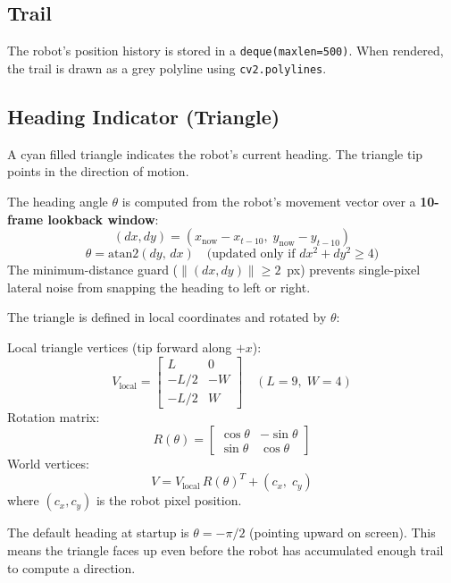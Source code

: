 \documentclass[12pt,a4paper]{article}
\begin{document}
\subsection{Trail}

The robot's position history is stored in a \texttt{deque(maxlen=500)}.
When rendered, the trail is drawn as a grey polyline using
\texttt{cv2.polylines}.

\subsection{Heading Indicator (Triangle)}

A cyan filled triangle indicates the robot's current heading.
The triangle tip points in the direction of motion.

\begin{tcolorbox}[formulabox, title={Heading Angle}]
The heading angle $\theta$ is computed from the robot's movement vector
over a \textbf{10-frame lookback window}:
\[
  (dx, dy) = (x_{\text{now}} - x_{t-10},\; y_{\text{now}} - y_{t-10})
\]
\[
  \theta = \mathrm{atan2}(dy,\, dx)
  \quad \text{(updated only if } dx^2 + dy^2 \geq 4\text{)}
\]
The minimum-distance guard ($\|{(dx,dy)}\| \geq 2$~px) prevents single-pixel
lateral noise from snapping the heading to left or right.
\end{tcolorbox}

The triangle is defined in local coordinates and rotated by $\theta$:

\begin{tcolorbox}[formulabox, title={Triangle Rotation}]
Local triangle vertices (tip forward along $+x$):
\[
  V_{\text{local}} = \begin{bmatrix} L & 0 \\ -L/2 & -W \\ -L/2 & W \end{bmatrix}
  \quad (L=9,\; W=4)
\]
Rotation matrix:
\[
  R(\theta) = \begin{bmatrix} \cos\theta & -\sin\theta \\ \sin\theta & \cos\theta \end{bmatrix}
\]
World vertices:
\[
  V = V_{\text{local}}\, R(\theta)^T + (c_x,\; c_y)
\]
where $(c_x, c_y)$ is the robot pixel position.
\end{tcolorbox}

\begin{tcolorbox}[notebox]
  The default heading at startup is $\theta = -\pi/2$ (pointing upward
  on screen). This means the triangle faces up even before the robot
  has accumulated enough trail to compute a direction.
\end{tcolorbox}
\end{document}
